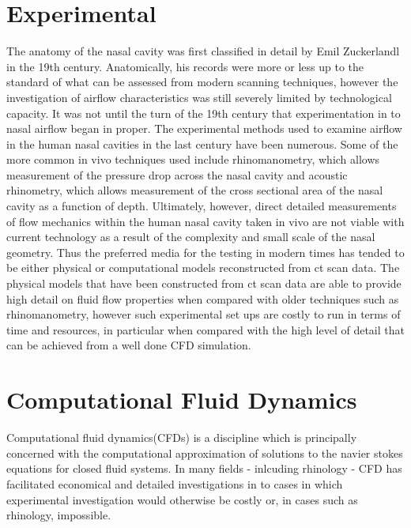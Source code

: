 \section{Experimental}
The anatomy of the nasal cavity was first classified in detail by Emil Zuckerlandl in the 19th century\cite{Stammberger1989}. Anatomically, his records were more or less up to the standard of what can be assessed from modern scanning techniques\cite{Stammberger1989}, however the investigation of airflow characteristics was still severely limited by technological capacity\cite{Eccles2000}. It was not until the turn of the 19th century that experimentation in to nasal airflow began in proper\cite{Eccles2000}. The experimental methods used to examine airflow in the human nasal cavities in the last century have been numerous. Some of the more common in vivo techniques used include rhinomanometry, which allows measurement of the pressure drop across the nasal cavity\cite{Hilberg1989} and acoustic rhinometry, which allows measurement of the cross sectional area of the nasal cavity as a function of depth\cite{Hilberg1989}. Ultimately, however, direct detailed measurements of flow mechanics within the human nasal cavity taken in vivo are not viable with current technology as a result of the complexity and small scale of the nasal geometry\cite{Doorly2008c}. Thus the preferred media for the testing in modern times has tended to be either physical or computational models reconstructed from ct scan data\cite{Doorly2008c}. The physical models that have been constructed from ct scan data are able to provide high detail on fluid flow properties when compared with older techniques such as rhinomanometry\cite{Ma2009}, however such experimental set ups are costly to run in terms of time and resources, in particular when compared with the high level of detail that can be achieved from a well done CFD simulation\cite{Ma2009}.

\section{Computational Fluid Dynamics}
Computational fluid dynamics(CFDs) is a discipline which is principally concerned with the computational approximation of solutions to the navier stokes equations for closed fluid systems\cite{Tu2008}. In many fields - inlcuding rhinology - CFD has facilitated economical and detailed investigations in to cases in which experimental investigation would otherwise be costly or, in cases such as rhinology, impossible\cite{Keyhani1995}.

